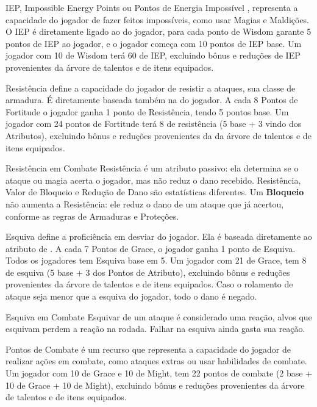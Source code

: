 IEP, Impossible Energy Points ou Pontos de Energia Impossível , 
representa a capacidade do jogador de fazer feitos impossíveis, como usar Magias e Maldições. 
O IEP é diretamente ligado ao  do jogador, para cada ponto de Wisdom 
garante 5 pontos de IEP ao jogador, e o jogador começa com 10 pontos de IEP base. Um jogador com 10 de Wisdom terá 60 de IEP, excluindo bônus 
e reduções de IEP provenientes da árvore de talentos e de itens equipados.

Resistência define a capacidade do jogador de resistir a ataques, sua classe de armadura. 
É diretamente baseada também na  
do jogador. A cada 8 Pontos de Fortitude o jogador ganha 1 ponto de Resistência, tendo 5 pontos base. 
Um jogador com 24 pontos de Fortitude terá 8 de resistência (5 base + 3 vindo dos Atributos), 
excluindo bônus e reduções provenientes da da árvore de talentos e de itens equipados.

\begin{rpgboxtips}{Resistência em Combate}
Resistência é um atributo passivo: ela determina se o ataque ou magia acerta o jogador, mas não reduz o dano recebido. Resistência, Valor de Bloqueio e Redução de Dano são estatísticas diferentes. Um \textbf{Bloqueio} não aumenta a Resistência: ele reduz o dano de um ataque que já acertou, conforme as regras de Armaduras e Proteções.
\end{rpgboxtips}

Esquiva define a proficiência em desviar do jogador. Ela é baseada diretamente ao atributo de . 
A cada 7 Pontos de Grace, o jogador ganha 1 ponto de Esquiva. Todos os jogadores tem Esquiva base em 5. 
Um jogador com 21 de Grace, tem 8 de esquiva (5 base + 3 dos Pontos de Atributo), 
excluindo bônus e reduções provenientes da árvore de talentos e de itens equipados. 
Caso o rolamento de ataque seja menor que a esquiva do jogador, todo o dano é negado.

\begin{rpgboxtips}{Esquiva em Combate}
Esquivar de um ataque é considerado uma reação, alvos que esquivam perdem a reação na rodada. 
Falhar na esquiva ainda gasta sua reação.
\end{rpgboxtips}

Pontos de Combate é um recurso que representa a capacidade do jogador de realizar ações em combate, como ataques extras ou usar habilidades de combate.
Um jogador com 10 de Grace e 10 de Might, tem 22 pontos de combate (2 base + 10 de Grace + 10 de Might), excluindo bônus e reduções provenientes da árvore de talentos e de itens equipados.


